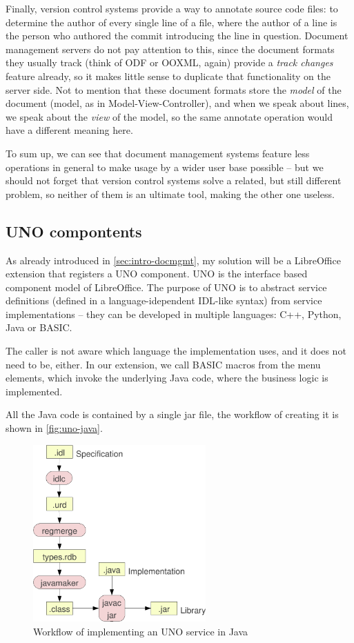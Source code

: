 Finally, version control systems provide a way to annotate source code files:
to determine the author of every single line of a file, where the author of a
line is the person who authored the commit introducing the line in question.
Document management servers do not pay attention to this, since the document
formats they usually track (think of ODF or OOXML, again) provide a \emph{track
changes} feature already, so it makes little sense to duplicate that
functionality on the server side. Not to mention that these document
formats store the \emph{model} of the document (model, as in
Model-View-Controller), and when we speak about lines, we speak about the
\emph{view} of the model, so the same annotate operation would have a different
meaning here.

To sum up, we can see that document management systems feature less operations
in general to make usage by a wider user base possible -- but we should not
forget that version control systems solve a related, but still different
problem, so neither of them is an ultimate tool, making the other one useless.

\subsection{UNO compontents}

As already introduced in \autoref{sec:intro-docmgmt}, my solution will be a
LibreOffice extension that registers a UNO \cite{uno} component. UNO is the
interface based component model of LibreOffice. The purpose of UNO is to
abstract service definitions (defined in a language-idependent IDL-like syntax)
from service implementations -- they can be developed in multiple languages:
C++, Python, Java or BASIC.

The caller is not aware which language the implementation uses, and it does not
need to be, either. In our extension, we call BASIC macros from the menu elements,
which invoke the underlying Java code, where the business logic is implemented.

All the Java code is contained by a single jar file, the workflow of creating
it is shown in \autoref{fig:uno-java}.

\begin{figure}[H]
\centering
\includegraphics[width=250px,keepaspectratio]{uno-java.pdf}
\caption{Workflow of implementing an UNO service in Java}
\label{fig:uno-java}
\end{figure}

